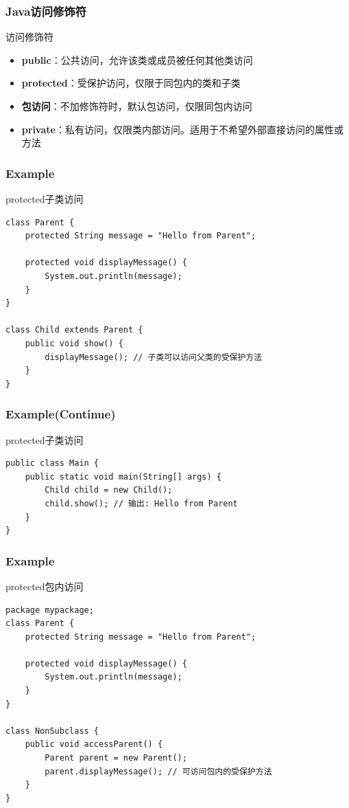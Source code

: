 \documentclass[UTF8, 16pt]{beamer}
\begin{document}
\begin{frame}
    \frametitle{Java访问修饰符}
    \textcolor{sufered}{访问修饰符}

    \begin{itemize}
        \item \textbf{public}：公共访问，允许该类或成员被任何其他类访问
        \item \textbf{protected}：受保护访问，仅限于同包内的类和子类
        \item \textbf{包访问}：不加修饰符时，默认包访问，仅限同包内访问
        \item \textbf{private}：私有访问，仅限类内部访问。适用于不希望外部直接访问的属性或方法
    \end{itemize}
\end{frame}

\begin{frame}[fragile]
    \frametitle{Example}
    \textcolor{sufered}{protected子类访问}

    \begin{lstlisting}
class Parent {
    protected String message = "Hello from Parent";

    protected void displayMessage() {
        System.out.println(message);
    }
}

class Child extends Parent {
    public void show() {
        displayMessage(); // 子类可以访问父类的受保护方法
    }
}
    \end{lstlisting}
\end{frame}

\begin{frame}[fragile]
    \frametitle{Example(Continue)}
    \textcolor{sufered}{protected子类访问}
    \begin{lstlisting}
public class Main {
    public static void main(String[] args) {
        Child child = new Child();
        child.show(); // 输出: Hello from Parent
    }
}
    \end{lstlisting}
\end{frame}

\begin{frame}[fragile]
    \frametitle{Example}
    \textcolor{sufered}{protected包内访问}

    \begin{lstlisting}
package mypackage;
class Parent {
    protected String message = "Hello from Parent";

    protected void displayMessage() {
        System.out.println(message);
    }
}

class NonSubclass {
    public void accessParent() {
        Parent parent = new Parent();
        parent.displayMessage(); // 可访问包内的受保护方法
    }
}
        \end{lstlisting}
\end{frame}
\end{document}
